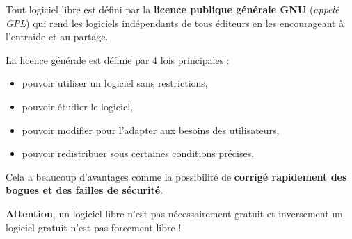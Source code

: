 Tout logiciel libre est défini par la \textbf{licence publique générale GNU}
 (\textit{appelé GPL}) qui rend les logiciels indépendants de tous éditeurs en
 les encourageant à l'entraide et au partage.

La licence générale est définie par 4 lois principales :
\begin{itemize}
	\item pouvoir utiliser un logiciel sans restrictions,
	\item pouvoir étudier le logiciel,
	\item pouvoir modifier pour l'adapter aux besoins des utilisateurs,
	\item pouvoir redistribuer sous certaines conditions précises.
\end{itemize}
Cela a beaucoup d'avantages comme la possibilité de \textbf{corrigé rapidement
des bogues et des failles de sécurité}.\newline

\textbf{Attention}, un logiciel libre n'est pas nécessairement gratuit et
inversement un logiciel gratuit n'est pas forcement libre !
